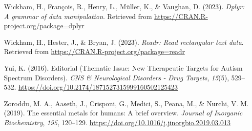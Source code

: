 \documentclass[
  man]{apa6}
\newlength{\cslhangindent}
\newlength{\cslentryspacingunit} %
\newenvironment{CSLReferences}[2] %
 {%
  \setlength{\parindent}{0pt}
  \ifodd #1
  \let\oldpar\par
  \def\par{\hangindent=\cslhangindent\oldpar}
  \fi
  \setlength{\parskip}{#2\cslentryspacingunit}
 }%
 {}
\begin{document}
\begin{CSLReferences}{1}{0}
\leavevmode{}%
Wickham, H., François, R., Henry, L., Müller, K., \& Vaughan, D. (2023). \emph{Dplyr: A grammar of data manipulation}. Retrieved from \url{https://CRAN.R-project.org/package=dplyr}

\leavevmode{}%
Wickham, H., Hester, J., \& Bryan, J. (2023). \emph{Readr: Read rectangular text data}. Retrieved from \url{https://CRAN.R-project.org/package=readr}

\leavevmode{}%
Yui, K. (2016). Editorial ({Thematic Issue}: {New Therapeutic Targets} for {Autism Spectrum Disorders}). \emph{CNS \& Neurological Disorders - Drug Targets}, \emph{15}(5), 529--532. \url{https://doi.org/10.2174/1871527315999160502125423}

\leavevmode{}%
Zoroddu, M. A., Aaseth, J., Crisponi, G., Medici, S., Peana, M., \& Nurchi, V. M. (2019). The essential metals for humans: A brief overview. \emph{Journal of Inorganic Biochemistry}, \emph{195}, 120--129. \url{https://doi.org/10.1016/j.jinorgbio.2019.03.013}

\end{CSLReferences}
\end{document}
